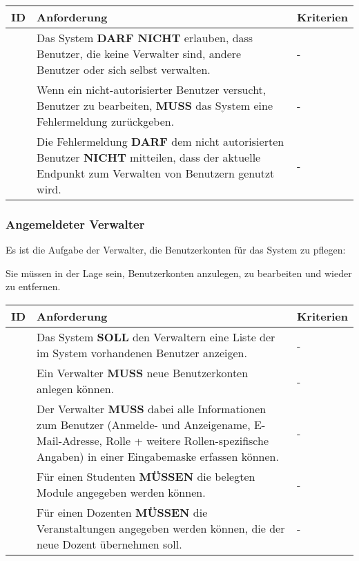 \vspace{12pt}


\begin{tabular} {|p{}|p{}|p{}|}
	\hline
	ID & Anforderung & Kriterien \\
	\hline
	\printfreqnr
	& Das System \textbf{DARF NICHT} erlauben, dass Benutzer, die keine Verwalter sind, andere Benutzer oder sich selbst verwalten. 
	& - \\
	\hline
	\printfreqnr
	& Wenn ein nicht-autorisierter Benutzer versucht, Benutzer zu bearbeiten, \textbf{MUSS} das System eine Fehlermeldung zurückgeben.
	& - \\ 
	\hline
	\printfreqnr
	& Die Fehlermeldung \textbf{DARF} dem nicht autorisierten Benutzer \textbf{NICHT} mitteilen, dass der aktuelle Endpunkt zum Verwalten von Benutzern genutzt wird.
	& - \\ 
	\hline
\end{tabular}

\vspace{12pt}

\subsubsection{Angemeldeter Verwalter}
Es ist die Aufgabe der Verwalter, die Benutzerkonten für das System zu pflegen:

Sie müssen in der Lage sein, Benutzerkonten anzulegen, zu bearbeiten und wieder zu entfernen.

\vspace{12pt}

\begin{tabular} {|p{}|p{}|p{}|}
	\hline
	ID & Anforderung & Kriterien \\
	\hline
	\printfreqnr
	& Das System \textbf{SOLL} den Verwaltern eine Liste der im System vorhandenen Benutzer anzeigen.
	& - \\ 
	\hline
	\printfreqnr
	& Ein Verwalter \textbf{MUSS} neue Benutzerkonten anlegen können. 
	& - \\
	\hline
	\printfreqnr
	& Der Verwalter \textbf{MUSS} dabei alle Informationen zum Benutzer (Anmelde- und Anzeigename, E-Mail-Adresse, Rolle + weitere Rollen-spezifische Angaben) in einer Eingabemaske erfassen können.
	& - \\ 
	\hline
	\printfreqnr
	& Für einen Studenten \textbf{MÜSSEN} die belegten Module angegeben werden können.
	& - \\ 
	\hline
	\printfreqnr
	& Für einen Dozenten \textbf{MÜSSEN} die Veranstaltungen angegeben werden können, die der neue Dozent übernehmen soll.
	& - \\ 
	\hline
\end{tabular}

